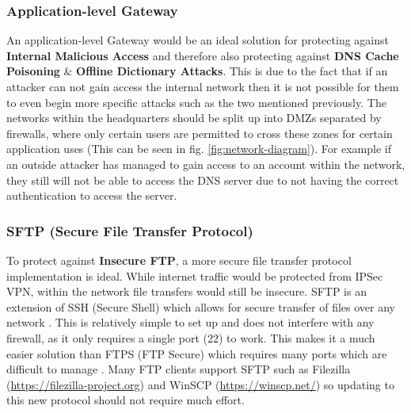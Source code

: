 \documentclass[11pt]{article}
\begin{document}
        \subsubsection{Application-level Gateway} \label{app-gateway}
          An application-level Gateway would be an ideal solution for protecting against \textbf{Internal Malicious Access} and therefore also protecting against \textbf{DNS Cache Poisoning} \& \textbf{Offline Dictionary Attacks}. This is due to the fact that if an attacker can not gain access the internal network then it is not possible for them to even begin more specific attacks such as the two mentioned previously. The networks within the headquarters should be split up into DMZs separated by firewalls, where only certain users are permitted to cross these zones for certain application uses (This can be seen in fig. \ref{fig:network-diagram}). For example if an outside attacker has managed to gain access to an account within the network, they still will not be able to access the DNS server due to not having the correct authentication to access the server.

        \subsubsection{SFTP (Secure File Transfer Protocol)}
          To protect against \textbf{Insecure FTP}, a more secure file transfer protocol implementation is ideal. While internet traffic would be protected from IPSec VPN, within the network file transfers would still be insecure. SFTP is an extension of SSH (Secure Shell) which allows for secure transfer of files over any network \citep{sshSFTP}. This is relatively simple to set up and does not interfere with any firewall, as it only requires a single port (22) to work. This makes it a much easier solution than FTPS (FTP Secure) which requires many ports which are difficult to manage \citep{ga2011sftp}. Many FTP clients support SFTP such as Filezilla (\url{https://filezilla-project.org}) and WinSCP (\url{https://winscp.net/}) so updating to this new protocol should not require much effort.
\end{document}
